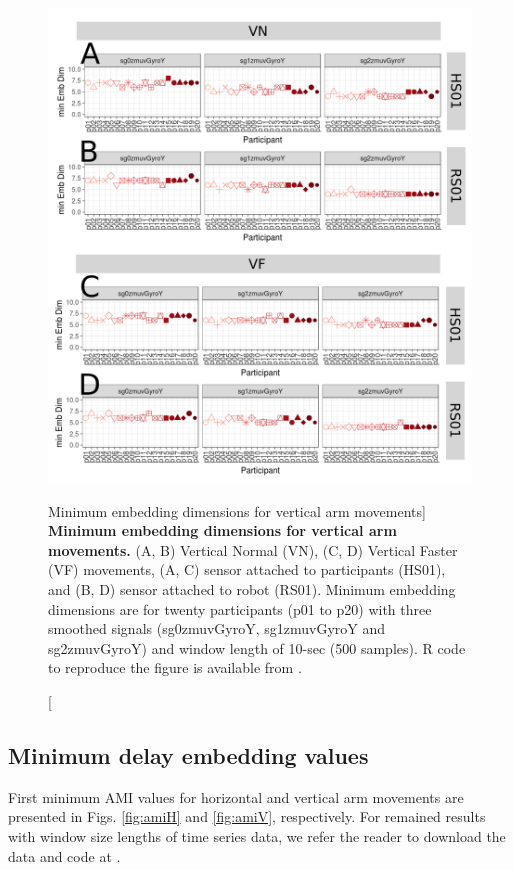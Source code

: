 \begin{figure}
\centering
\includegraphics[width=1.0\textwidth]{cao_aVw10}
	\caption
	[Minimum embedding dimensions for vertical arm movements]{
	{\bf Minimum embedding dimensions for vertical arm movements.} 
		(A, B) Vertical Normal (VN), (C, D) Vertical Faster (VF) 
		movements,
		(A, C) sensor attached to participants (HS01), and		
		(B, D) sensor attached to robot (RS01).
		Minimum embedding dimensions are for twenty participants 
		(p01 to p20) with three smoothed signals (sg0zmuvGyroY, 
		sg1zmuvGyroY and sg2zmuvGyroY) 
		and window length of 10-sec (500 samples).
		R code to reproduce the figure is available 
		from \cite{xochicale2018}.
        }
    \label{fig:caoV}
\end{figure}


\newpage
\subsection{Minimum delay embedding values}
First minimum AMI values for horizontal and vertical arm movements
are presented in Figs.  \ref{fig:amiH} and \ref{fig:amiV}, respectively.
For remained  results with window size lengths of time series data, we refer
the reader to download the data and code at \cite{xochicale2018}.


